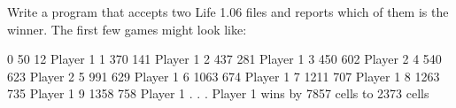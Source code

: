 \begin{exercise}
Write  a program that accepts two Life 1.06 files and reports which of them is the winner.
The first few games might look like:
\begin{terminaloutput}

        0    50    12  Player 1
        1   370   141  Player 1
        2   437   281  Player 1
        3   450   602  Player 2
        4   540   623  Player 2
        5   991   629  Player 1
        6  1063   674  Player 1
        7  1211   707  Player 1
        8  1263   735  Player 1
        9  1358   758  Player 1
.
.
.
    Player 1 wins by 7857 cells to 2373 cells
\end{terminaloutput}
\end{exercise}
